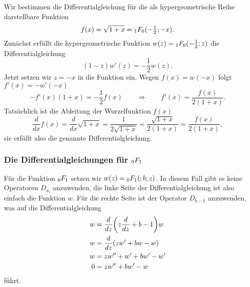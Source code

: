 \begin{beispiel}
Wir bestimmen die Differentialgleichung für die als hypergeometrische
Reihe darstellbare Funktion
\[
f(x)
=
\sqrt{1+x} = \mathstrut_1F_0(-{\textstyle\frac12};-x).
\]
%
%
Zunächst erfüllt die hypergeometrische Funktion
$w(z)=\mathstrut_1F_0(-\frac12;z)$ die Differentialgleichung
\[
(1-z)w'(z) = -\frac12 w(z).
\]
Jetzt setzen wir $z=-x$ in die Funktion ein.
Wegen $f(x)=w(-x)$ folgt $f'(x)=-w'(-x)$
\[
-f'(x)(1+x) = -\frac12 f(x)
\qquad\Rightarrow\qquad
f'(x) = \frac{f(x)}{2(1+x)}.
\]
Tatsächlich ist die Ableitung der Wurzelfunktion $f(x)$
\[
\frac{d}{dx}f(x)
=
\frac{d}{dx}\sqrt{1+x}
=
\frac{1}{2\sqrt{1+x}}
=
\frac{\sqrt{1+x}}{2(1+x)}
=
\frac{f(x)}{2(1+x)},
\]
sie erfüllt also die genannte Differentialgleichung.
\end{beispiel}

%
%
\subsubsection{Die Differentialgleichungen für $\mathstrut_0F_1$}
Für die Funktion $\mathstrut_0F_1$ setzen wir
$w(z)=\mathstrut_0F_1(;b;z)$.
In diesem Fall gibt es keine Operatoren $D_{a_i}$ anzuwenden, die
linke Seite der Differentialgleichung ist also einfach die Funktion $w$.
Für die rechte Seite ist der Operator $D_{b-1}$ anzuwenden, was auf
die Differentialgleichung
\begin{align}
w
&=
\frac{d}{dz}
\biggl(z\frac{d}{dz}+b -1\biggr)w
\notag
\\
w
&=
\frac{d}{dz}(zw'+b w - w)
\notag
\\
w
&=
zw''+w'+b w' -w'
\notag
\\
0
&=
zw''+b w' - w
\label{buch:differentialgleichungen:0f1:dgl}
\end{align}
führt.


